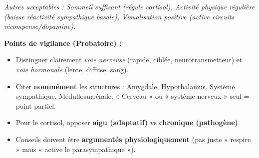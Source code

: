 \documentclass[11pt]{article}
\begin{document}
\begin{corrige}
\begin{enumerate}
\textit{Autres acceptables : Sommeil suffisant (régule cortisol), Activité physique régulière (baisse réactivité sympathique basale), Visualisation positive (active circuits récompense/dopamine).}
\end{enumerate}
\textbf{Points de vigilance (Probatoire) :}
\begin{itemize}
\item Distinguer clairement \emph{voie nerveuse} (rapide, ciblée, neurotransmetteur) et \emph{voie hormonale} (lente, diffuse, sang).
\item Citer \textbf{nommément} les structures : Amygdale, Hypothalamus, Système sympathique, Médullosurrénale. « Cerveau » ou « système nerveux » seul = point partiel.
\item Pour le cortisol, opposer \textbf{aigu (adaptatif)} vs \textbf{chronique (pathogène)}.
\item Conseils doivent être \textbf{argumentés physiologiquement} (pas juste « respire » mais « active le parasympathique »).
\end{itemize}
\end{corrige}
\end{document}
